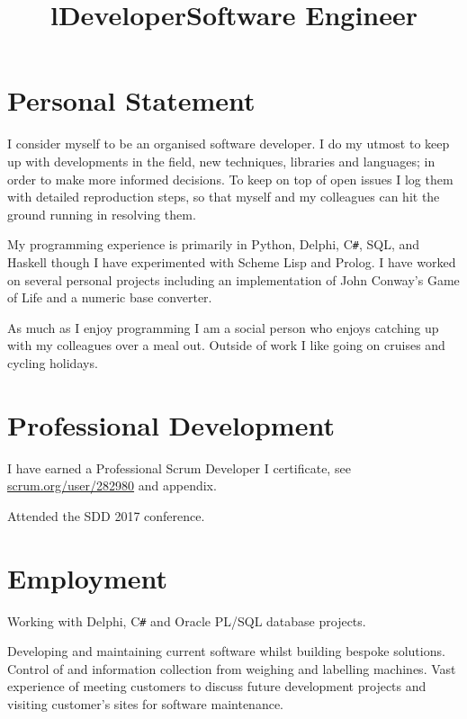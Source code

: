 \documentclass[line,margin]{res}
\title{l} \location{r} \\
\newcommand{\CSharp}{C\texttt{\#}}
\begin{document}
\begin{resume}
\section{Personal Statement}
I consider myself to be an organised software developer.
I do my utmost to keep up with developments in the field, new techniques, libraries and languages; in order to make more informed decisions.
To keep on top of open issues I log them with detailed reproduction steps, so that myself and my colleagues can hit the ground running in resolving them.

My programming experience is primarily in Python, Delphi, {\CSharp}, SQL, and Haskell though I have experimented with Scheme Lisp and Prolog.
I have worked on several personal projects including an implementation of John Conway's Game of Life and a numeric base converter.

As much as I enjoy programming I am a social person who enjoys catching up with my colleagues over a meal out.
Outside of work I like going on cruises and cycling holidays.

\section{Professional Development}
I have earned a Professional Scrum Developer I certificate, see \href{https://www.scrum.org/user/282980}{scrum.org/user/282980} and appendix.

Attended the SDD 2017 conference.

\section{Employment}

\title{Developer}
\begin{position}
Working with Delphi, {\CSharp} and Oracle PL/SQL database projects.
\end{position}

\title{Software Engineer}
\begin{position}
Developing and maintaining current software whilst building bespoke solutions.
Control of and information collection from weighing and labelling machines.
Vast experience of meeting customers to discuss future development projects and visiting customer's sites for software maintenance.


\end{position}
\end{resume}
\end{document}
